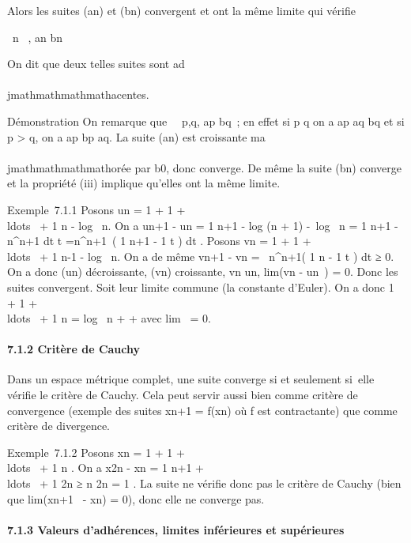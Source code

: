Alors les suites (an) et (bn) convergent et ont la
même limite \ell qui vérifie

\forall~n \in {}~, an \leq \ell \leq bn~

On dit que deux telles suites sont ad\\\\jmathmathmathmathacentes.

Démonstration On remarque que \forall~~p,q,
ap \leq bq~; en effet si p \leq q on a ap \leq
aq \leq bq et si p \textgreater{} q, on a ap
\leq bp \leq aq. La suite (an) est croissante
ma\\\\jmathmathmathmathorée par b0, donc converge. De même la suite (bn)
converge et la propriété (iii) implique qu'elles ont la même limite.

Exemple~7.1.1 Posons un = 1 + 1  +
\\ldots~ + 1
\over n - log~ n. On a
un+1 - un = 1 \over n+1
- log (n + 1) -\ log~
n = 1 \over n+1 -\int ~
n^n+1 dt \over t
=\int  n^n+1~( 1
\over n+1 - 1 \over t ) dt .
Posons vn = 1 + 1  +
\\ldots~ + 1
\over n-1 - log~ n. On a de
même vn+1 - vn =\int ~
n^n+1( 1 \over n - 1
\over t ) dt ≥ 0. On a donc (un)
décroissante, (vn) croissante, vn \leq un,
lim(vn - un~) = 0. Donc les
suites convergent. Soit \gamma leur limite commune (la constante d'Euler). On
a donc 1 + 1  +
\\ldots~ + 1
\over n = log~ n + \gamma +
\epsilonn avec lim\epsilonn~ = 0.

\paragraph{7.1.2 Critère de Cauchy}

Dans un espace métrique complet, une suite converge si et seulement
si~elle vérifie le critère de Cauchy. Cela peut servir aussi bien comme
critère de convergence (exemple des suites xn+1 =
f(xn) où f est contractante) que comme critère de divergence.

Exemple~7.1.2 Posons xn = 1 + 1  +
\\ldots~ + 1
\over n . On a x2n - xn = 1
\over n+1 +
\\ldots~ + 1
\over 2n ≥ n  \over 2n = 1
 . La suite ne vérifie donc pas le critère de
Cauchy (bien que lim(xn+1~ -
xn) = 0), donc elle ne converge pas.

\paragraph{7.1.3 Valeurs d'adhérences, limites inférieures et
supérieures}

